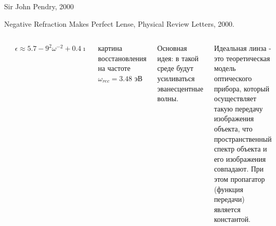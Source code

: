 \documentclass[9pt, compress, xcolor=table]{beamer}
\begin{document}
\begin{frame}{Sir John Pendry, 2000}

Negative Refraction Makes Perfect Lense, Physical Review Letters, 2000.

\begin{columns}[c]
\column{6cm}
\begin{center}
\includegraphics[width=0.5\textwidth]{neg_ref_13}
\end{center}
 $\epsilon \approx 5.7 - 9^2 \omega^{-2} +0.4 \imath$

картина восстановления на частоте $\omega_{rec} = 3.48$ эВ
\column{6cm}



\textcolor{red!50!black}{Основная идея}: в такой среде будут усиливаться эванесцентные волны.

Идеальная линза - это теоретическая модель оптического прибора, который осуществляет такую передачу
изображения объекта, что пространственный спектр объекта и его изображения совпадают. При этом
пропагатор (функция передачи) является константой.

\end{columns}
\end{frame}
\end{document}
